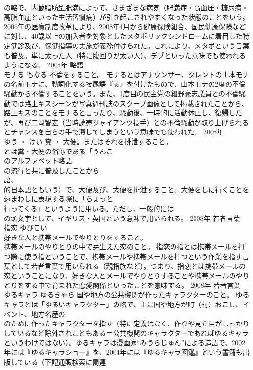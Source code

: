 \documentclass[8pt]{extreport}
\begin{document}
\begin{CJK}{UTF8}{min}
\\	の略で、内蔵脂肪型肥満によって、さまざまな病気（肥満症・高血圧・糖尿病・高脂血症といった生活習慣病）が引き起こされやすくなった状態のことをいう。2006年の医療制度改革により、2008年4月から健康保険組合、国民健康保険などに対し、40歳以上の加入者を対象としたメタボリックシンドロームに着目した特定健診及び、保健指導の実施が義務付けられた。これにより、メタボという言葉も普及。単に太った人（特に腹回りが太い人）、デブといった意味でも使われるようになる。	2008年	略語	
\\	モナる	もなる	不倫をすること。	モナるとはアナウンサー、タレントの山本モナの名前モナに、動詞化する接尾語『る』を付けたもので、山本モナの2度の不倫騒動から不倫することをいう。また、1度目の民主党の細野豪志議員との不倫騒動では路上キスシーンが写真週刊誌のスクープ画像として掲載されたことから、路上キスのことをモナると言ったり、騒動後、一時的に活動休止し、復帰したが、再び二岡智宏（当時読売ジャイアンツ投手）との不倫騒動が取り上げられるとチャンスを自らの手で潰してしまうという意味でも使われた。	2008年	
\\	ゆう ・ けい	糞 ・ 大便。またはそれを排泄すること。	
\\	とは糞・大便の俗称である「うんこ
\\	のアルファベット略語
\\	の流行と共に普及したことから
\\	語、
\\	的日本語ともいう）で、大便及び、大便を排泄すること。大便をしに行くことを遠まわしに表現する際に「ちょっと
\\	行ってくる」というように用いる。ただし、一般的には
\\	の頭文字として、イギリス・英国という意味で用いられる。	2008年	若者言葉	
\\	指恋	ゆびこい	
\\	好きな人と携帯メールでやりとりをすること。 
\\	携帯メールのやりとりの中で芽生えた恋のこと。	指恋の指とは携帯メールを打つ際に使う指ということで、携帯メールや携帯メールを打つという作業を指す言葉として若者言葉で用いられる（親指族など）。つまり、指恋とは携帯メールの恋ということになり、好きな人とメールでやりとりすることや携帯メールのやりとりをする中で育まれた恋愛関係といったことを意味する。	2008年	若者言葉	
\\	ゆるキャラ	ゆるきゃら	国や地方の公共機関が作ったキャラクターのこと。	ゆるキャラとは「ゆるいキャラクター」の略で、主に国や地方が町（村）おこし、イベント、地方名産の
\\	のために作ったキャラクターを指す（特に定義はなく、作りや見た目がしっかりしているなど除外されこともある＝公共機関のキャラクターであればゆるキャラというわけではない）。ゆるキャラは漫画家“みうらじゅん”による造語で、2002年には『ゆるキャラショー』を、2004年には『ゆるキャラ図鑑』という書籍も出版している（下記通販検索に関連

\end{CJK}
\end{document}
